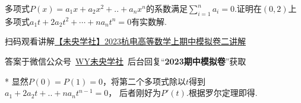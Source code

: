 \begin{problem}
多项式$P(x)=a_1x+a_2x^2+..+a_nx^n$的系数满足$\sum^{n}_{i=1}a_i=0$.证明在$(0,2)$上多项式$a_1t+2a_2t^2+\cdots+na_nt^n=0$有实数解.
\end{problem}
\begin{draft}
\begin{minipage}{0.81\textwidth}
\begin{flushright}\color{black}
        扫码观看讲解\href{https://b23.tv/QX7ACak}{【未央学社】2023杭电高等数学上期中模拟卷二讲解}

        答案于微信公众号~\href{http://weixin.qq.com/r/mhKYgFTEMQlOrRDj90eI}{WY未央学社}~后台回复“\textbf{2023期中模拟卷}”获取
\end{flushright}
\end{minipage}
\begin{minipage}{0.15\textwidth}
\end{minipage}
\vspace{-1em}
\end{draft}
\begin{solution}*
        显然$P(0)=P(1)=0$，将第二个多项式除以$t$得到$a_1+2a_2t+..+na_nt^{n-1}=0$，
        后者刚好为$P'(t)$.根据罗尔定理即得.
\end{solution}